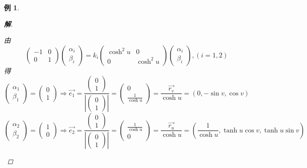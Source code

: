 \documentclass{article}                     %
\numberwithin{equation}{section}            %
\numberwithin{figure}{section}              %
\numberwithin{table}{section}               %
\newtheorem{example}{\indent 例}[section]
\newenvironment{solution}{\begin{proof}[\indent\bf 解]}{\end{proof}}
\begin{document}
\begin{example}
\begin{solution}
\begin{enumerate}
            由
            \begin{equation*}
                \begin{pmatrix} -1&0 \\ 0&1\end{pmatrix}\begin{pmatrix}\alpha _i\\ \beta _i \end{pmatrix}=k_i\begin{pmatrix} \cosh^2u&0 \\ 0&\cosh^2u \end{pmatrix}\begin{pmatrix} \alpha _i\\ \beta _i \end{pmatrix},(i=1,2)
            \end{equation*}
            得
            \begin{equation*}
                \begin{pmatrix}\alpha _1\\ \beta _1\end{pmatrix}=\begin{pmatrix}0\\1\end{pmatrix}
                \Longrightarrow 
                \vec{e_1}=\frac{\begin{pmatrix}0\\1\end{pmatrix}}{\left | \begin{pmatrix}0\\1\end{pmatrix} \right | }=\begin{pmatrix}0\\\frac{1}{\cosh{u}}\end{pmatrix}=\frac{\vec{r_v} }{\cosh{u}}=(0,-\sin{v},\cos{v})   
            \end{equation*}
            \begin{equation*}
                \begin{pmatrix}\alpha _2\\ \beta _2\end{pmatrix}=\begin{pmatrix}1\\0\end{pmatrix}
                \Longrightarrow 
                \vec{e_2}=\frac{\begin{pmatrix}0\\1\end{pmatrix}}{\left | \begin{pmatrix}0\\1\end{pmatrix} \right | }=\begin{pmatrix}\frac{1}{\cosh{u}}\\0\end{pmatrix}=\frac{\vec{r_u} }{\cosh{u}}=(\frac{1}{\cosh{u}},\tanh{u}\cos{v},\tanh{u}\sin{v})   

\end{equation*}
\end{enumerate}
\end{solution}
\end{example}
\end{document}

